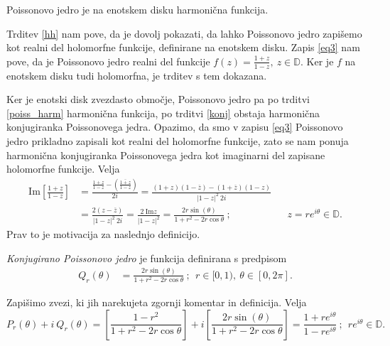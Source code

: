 \documentclass[mat1, tisk]{fmfdelo}
\begin{document}
    \begin{trditev}
        \label{poiss_harm}
        Poissonovo jedro je na enotskem disku harmonična funkcija. 
    \end{trditev}
    \begin{dokaz}
        Trditev \ref{hh} nam pove, da je dovolj pokazati, da lahko Poissonovo jedro zapišemo kot realni del holomorfne funkcije, definirane na enotskem disku.
        Zapis \eqref{eq3} nam pove, da je Poissonovo jedro realni del funkcije $f(z) = \frac{1 + z}{1 - z},~z \in \mathbb{D}$. Ker je $f$ na enotskem disku tudi holomorfna, je trditev s tem dokazana. 
    \end{dokaz}

    Ker je enotski disk zvezdasto območje, Poissonovo jedro pa po trditvi \ref{poiss_harm} harmonična funkcija, po trditvi \ref{konj} obstaja harmonična konjugiranka Poissonovega jedra. 
    Opazimo, da smo v zapisu \eqref{eq3} Poissonovo jedro prikladno zapisali kot realni del holomorfne funkcije, zato se nam ponuja harmonična konjugiranka Poissonovega jedra kot imaginarni del zapisane holomorfne funkcije.
    Velja
    \begin{align*}
        \text{Im}\left[\frac{1 + z}{1-z}\right] &= \frac{\frac{1 + z}{1-z} - \left(\overline{\frac{1 + z}{1-z}}\right)}{2i} = \frac{(1 + z)(1 - \overline{z}) - (1 + \overline{z})(1 - z)}{|1 - z|^2~2i} & & \\ 
        & = \frac{2 (z - \overline{z})}{|1 - z|^2~2i} = \frac{2~\text{Im}z}{|1 - z|^2} = \frac{2 r \sin(\theta)}{1+ r^2 - 2r \cos\theta}~; & & z = r e^{i\theta} \in \mathbb{D}.
    \end{align*}
    Prav to je motivacija za naslednjo definicijo. 
    \begin{definicija}
        \emph{Konjugirano Poissonovo jedro} je funkcija definirana s predpisom
        \begin{align}
            Q_r(\theta) & = \frac{2 r \sin(\theta)}{1+ r^2 - 2r \cos\theta}~;~~r \in [0,1),~\theta \in [0,2\pi].
        \end{align}
    \end{definicija}

    \begin{opomba}
        Zapišimo zvezi, ki jih narekujeta zgornji komentar in definicija. Velja
        $$
        P_r(\theta) + i~Q_r(\theta) = \left[ \frac{1-r^2}{1+ r^2 - 2r \cos\theta}\right] + i \left[\frac{2 r \sin(\theta)}{1+ r^2 - 2r \cos\theta}\right] = \frac{1 + re^{i\theta}}{1 - re^{i\theta}}~;~~r e^{i\theta} \in \mathbb{D}.
        $$      
    \end{opomba}
\end{document}
